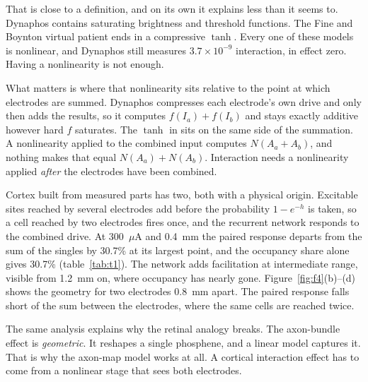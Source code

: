 \documentclass[10pt,twocolumn]{article}
\newcommand{\uA}{\ensuremath{\mu\text{A}}}
\begin{document}
That is close to a definition, and on its own it explains less than it
seems to. Dynaphos contains saturating brightness and threshold functions.
The Fine and Boynton virtual patient ends in a compressive $\tanh$. Every
one of these models is nonlinear, and Dynaphos still measures
$3.7\times10^{-9}$ interaction, in effect zero. Having a nonlinearity is
not enough.

What matters is where that nonlinearity sits relative to the point at
which electrodes are summed. Dynaphos compresses each electrode's own
drive and only then adds the results, so it computes $f(I_a) + f(I_b)$ and
stays exactly additive however hard $f$ saturates. The $\tanh$ in
\citep{fineboynton2024} sits on the same side of the summation. A
nonlinearity applied to the combined input computes $N(A_a + A_b)$, and
nothing makes that equal $N(A_a) + N(A_b)$. Interaction needs a
nonlinearity applied \emph{after} the electrodes have been combined.

Cortex built from measured parts has two, both with a physical origin.
Excitable sites reached by several electrodes add before the probability
$1-e^{-h}$ is taken, so a cell reached by two electrodes fires once, and
the recurrent network responds to the combined drive. At 300~\uA{} and
0.4~mm the paired response departs from the sum of the singles by 30.7\%
at its largest point, and the occupancy share alone gives 30.7\%
(table~\ref{tab:t1}). The network adds facilitation at intermediate
range, visible from 1.2~mm on, where occupancy has nearly gone.
Figure~\ref{fig:f4}(b)--(d) shows the geometry for two electrodes 0.8~mm
apart. The paired response falls short of the sum between the electrodes,
where the same cells are reached twice.

The same analysis explains why the retinal analogy breaks. The axon-bundle
effect is \textit{geometric}. It reshapes a single phosphene, and a linear
model captures it. That is why the axon-map model works at all. A
cortical interaction effect has to come from a nonlinear stage that sees
both electrodes.

\begin{table}[t]
\centering
\caption{Peak departure from linear superposition (\%), 300~\uA{} per
  electrode. The pooled-divisor rows are the alternative hypothesis of
  section~\ref{sec:pooled}. A 0 is zero to machine precision, and 0.0 a
  value that rounds to zero.}
\label{tab:t1}
\small
\setlength{\tabcolsep}{2.4pt}

\end{table}
\end{document}
